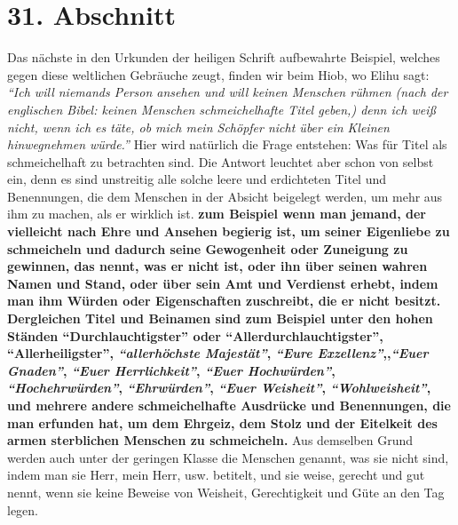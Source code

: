 \section{31. Abschnitt} \label{kap9_ab31}

Das nächste in den Urkunden der heiligen Schrift aufbewahrte Beispiel, welches
gegen diese weltlichen Gebräuche zeugt, finden wir beim Hiob, wo
Elihu sagt:
\textit{"`Ich will niemands Person ansehen und will keinen Menschen rühmen
(nach der
englischen Bibel: keinen Menschen schmeichelhafte Titel geben,) denn ich weiß
nicht, wenn ich es täte, ob mich mein Schöpfer nicht über ein Kleinen
hinwegnehmen würde."'}
Hier wird natürlich die Frage
entstehen: Was für Titel als schmeichelhaft zu betrachten sind. Die Antwort
leuchtet aber schon von selbst ein, denn es sind unstreitig alle solche leere
und erdichteten Titel und Benennungen, die dem Menschen in der Absicht beigelegt
werden, um mehr aus ihm zu machen, als er wirklich ist.
\label{ref:09_31_heuchelei} \textbf{zum Beispiel wenn man jemand,
der vielleicht nach Ehre und Ansehen begierig ist, um seiner
Eigenliebe zu
schmeicheln und dadurch seine Gewogenheit oder Zuneigung zu gewinnen, das
nennt, was er nicht ist, oder ihn über seinen wahren Namen und Stand, oder über
sein Amt und Verdienst erhebt, indem man ihm Würden oder Eigenschaften
zuschreibt, die er nicht besitzt. Dergleichen Titel und Beinamen sind zum
Beispiel unter
den hohen Ständen "`Durchlauchtigster"' oder "`Allerdurchlauchtigster"',
"`Allerheiligster"', \textit{"`allerhöchste Majestät"'}, \textit{"`Eure
Exzellenz"'},,\textit{"`Euer
Gnaden"'}, \textit{"`Euer Herrlichkeit"'}, \textit{"`Euer Hochwürden"'},
\textit{"`Hochehrwürden"'},
\textit{"`Ehrwürden"'}, \textit{"`Euer Weisheit"'}, \textit{"`Wohlweisheit"'},
und mehrere andere
schmeichelhafte Ausdrücke und Benennungen, die man erfunden hat, um dem Ehrgeiz,
dem Stolz und der Eitelkeit des armen sterblichen Menschen zu schmeicheln.}
Aus demselben Grund werden auch unter der geringen Klasse die Menschen
genannt, was sie nicht sind, indem man sie Herr, mein Herr, usw. betitelt,
und sie weise, gerecht und gut nennt, wenn sie keine Beweise von Weisheit,
Gerechtigkeit und Güte an den Tag legen.

\medskip

